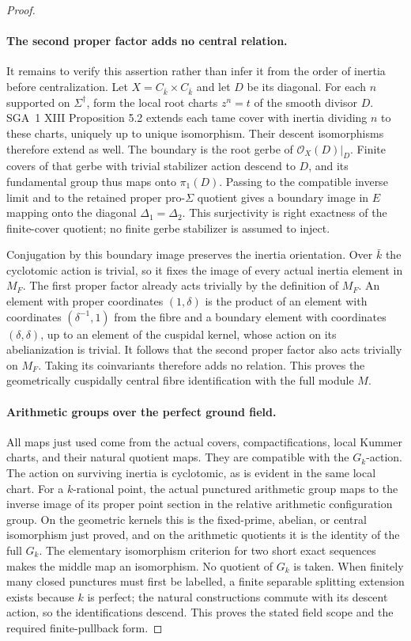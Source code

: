\begin{proof}
\paragraph{The second proper factor adds no central relation.}
It remains to verify this assertion rather than infer it from
the order of inertia before centralization. Let
$X=C_{\bar k}\times C_{\bar k}$ and let $D$ be its diagonal.
For each $n$ supported on $\Sigma^\dagger$, form the local
root charts $z^n=t$ of the smooth divisor $D$. SGA~1 XIII
Proposition 5.2 extends each tame cover with inertia dividing
$n$ to these charts, uniquely up to unique isomorphism.
Their descent isomorphisms therefore extend as well. The
boundary is the root gerbe of $\mathcal O_X(D)|_D$.
Finite covers of that gerbe with trivial stabilizer action
descend to $D$, and its fundamental group thus maps onto
$\pi_1(D)$. Passing to the compatible inverse limit and to
the retained proper pro-$\Sigma$ quotient gives a boundary
image in $E$ mapping onto the diagonal $\Delta_1=\Delta_2$.
This surjectivity is right exactness of the finite-cover
quotient; no finite gerbe stabilizer is assumed to inject.

Conjugation by this boundary image preserves the inertia
orientation. Over $\bar k$ the cyclotomic action is trivial,
so it fixes the image of every actual inertia element in
$M_F$. The first proper factor already acts trivially by the
definition of $M_F$. An element with proper coordinates
$(1,\delta)$ is the product of an element with coordinates
$(\delta^{-1},1)$ from the fibre and a boundary element with
coordinates $(\delta,\delta)$, up to an element of the
cuspidal kernel, whose action on its abelianization is trivial.
It follows that the second proper factor also acts trivially
on $M_F$. Taking its coinvariants therefore adds no relation.
This proves the geometrically cuspidally central fibre
identification with the full module $M$.

\paragraph{Arithmetic groups over the perfect ground field.}
All maps just used come from the actual covers, compactifications,
local Kummer charts, and their natural quotient maps. They are
compatible with the $G_k$-action. The action on surviving inertia
is cyclotomic, as is evident in the same local chart. For a
$k$-rational point, the actual punctured arithmetic group maps
to the inverse image of its proper point section in the relative
arithmetic configuration group. On the geometric kernels this
is the fixed-prime, abelian, or central isomorphism just proved,
and on the arithmetic quotients it is the identity of the full
$G_k$. The elementary isomorphism criterion for two short exact
sequences makes the middle map an isomorphism. No quotient of
$G_k$ is taken. When finitely many closed punctures must first
be labelled, a finite separable splitting extension exists
because $k$ is perfect; the natural constructions commute with
its descent action, so the identifications descend. This proves
the stated field scope and the required finite-pullback form.
\end{proof}

